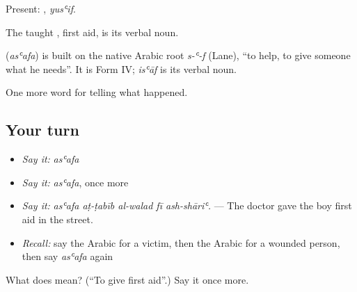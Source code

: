 Present: , \emph{yusʿif}.

The taught , first aid, is its verbal noun.

\begin{cousinweb}
\textbf{} (\emph{asʿafa}) is built on the native Arabic root \emph{s-ʿ-f} (Lane), \textquotedblleft{}to help, to give someone what he needs\textquotedblright{}. It is Form IV; \emph{isʿāf} is its verbal noun.
\end{cousinweb}

\begin{grammarlens}[title={What you've built}]
One more word for telling what happened.
\end{grammarlens}

\subsection*{Your turn}
\begin{itemize}
\raggedright
  \item \emph{Say it:} \emph{asʿafa}
  \item \emph{Say it:} \emph{asʿafa}, once more
  \item \emph{Say it:} \emph{asʿafa aṭ-ṭabīb al-walad fī ash-shāriʿ.} — The doctor gave the boy first aid in the street.
  \item \emph{Recall:} say the Arabic for a victim, then the Arabic for a wounded person, then say \emph{asʿafa} again
\end{itemize}

\begin{tcolorbox}[breakable,colback=teal!4,colframe=teal!35!black,title={Before you move on}]
What does  mean? (\textquotedblleft{}To give first aid\textquotedblright{}.) Say it once more.
\end{tcolorbox}
